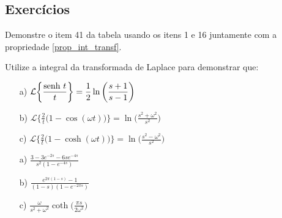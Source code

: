 \subsection*{Exercícios}%
\begin{exer}Demonstre o item 41 da tabela usando os itens 1 e 16 juntamente com a propriedade \ref{prop_int_transf}.
\end{exer}
\begin{exer}
Utilize a integral da transformada de Laplace para demonstrar que:
\begin{itemize}
  \item[a)] $\displaystyle \mathcal{L}\bigg\{ \frac{\operatorname{senh}\, t}{t} \bigg\} = \frac{1}{2} \ln \bigg(\frac{s+1}{s-1}\bigg)$
  \item[b)] $\displaystyle \mathcal{L}\bigg\{ \frac{2}{t} \big( 1 - \cos (\omega t) \big) \bigg\} = \ln \bigg(\frac{s^2 + \omega^2}{s^2}\bigg)$
  \item[c)] $\displaystyle \mathcal{L}\bigg\{ \frac{2}{t} \big( 1 - \cosh (\omega t) \big) \bigg\} = \ln \bigg(\frac{s^2 - \omega^2}{s^2}\bigg)$
\end{itemize}
\end{exer}
\begin{resp}
 \begin{itemize}
  \item[a)] $\displaystyle \frac{ 3 - 3 e^{-2s} - 6s e^{-4s} }{s^2 (1 - e^{-4s})}$
  \item[b)] $\displaystyle \frac{  e^{2\pi(1-s)} -1 }{(1-s) (1 - e^{-2\pi s})}$
  \item[c)] $\displaystyle \frac{\omega}{s^2 + \omega^2} \coth \bigg(\frac{\pi s}{2 \omega^2} \bigg)$
 \end{itemize}
\end{resp}

